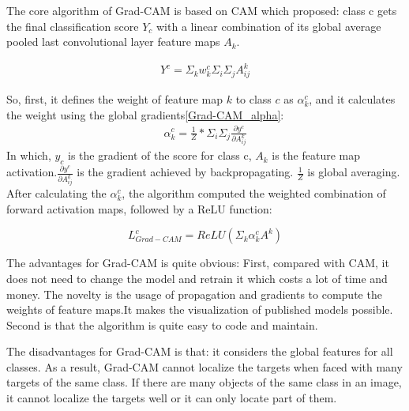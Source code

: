 \documentclass[conference]{IEEEtran}
\begin{document}
The core algorithm of Grad-CAM is based on CAM which proposed: class c gets the final classification score $Y_{c}$ with a linear combination of its global average pooled last convolutional layer feature maps $A_{k}$.

\begin{equation}
    \begin{aligned}
        Y^{c}=\Sigma_{k}w_{k}^{c}\Sigma_{i}\Sigma_{j}A_{ij}^{k}
        \label{Grad-CAM_Y}
    \end{aligned}
  \end{equation}

So, first, it defines the weight of feature map $k$ to class $c$ as $\alpha_{k}^{c}$, and it calculates the weight using the global gradients\ref{Grad-CAM_alpha}:
\begin{equation}
    \begin{aligned}
        \alpha_{k}^{c}=\frac{1}{Z}*\Sigma_{i}\Sigma_{j}\frac{\partial y^{c}}{\partial A_{ij}^{k}}
        \label{Grad-CAM_alpha}
    \end{aligned}
  \end{equation}
  In which, $y_{c}$ is the gradient of the score for class c, $A_{k}$ is the feature map activation.$\frac{\partial y^{c}}{\partial A_{ij}^{k}}$ is the gradient achieved by backpropagating. $\frac{1}{Z}$ is global averaging.
  After calculating the $\alpha_{k}^{c}$, the algorithm computed the weighted combination of forward activation maps, followed by a ReLU function:

$$L_{Grad-CAM}^{c}=ReLU(\Sigma_{k}\alpha_{k}^{c}A^{k})$$

The advantages for Grad-CAM is quite obvious: First, compared with CAM, it does not need to change the model and retrain it which costs a lot of time and money. 
The novelty is the usage of propagation and gradients to compute the weights of feature maps.It makes the visualization of published models possible. Second is that the algorithm is quite easy to code and maintain.\par
The disadvantages for Grad-CAM is that: it considers the global features for all classes. As a result, Grad-CAM cannot localize the targets when faced with many targets of the same class. If there are many objects of the same class in an image, it cannot localize the targets well or it can only locate part of them.
\end{document}
